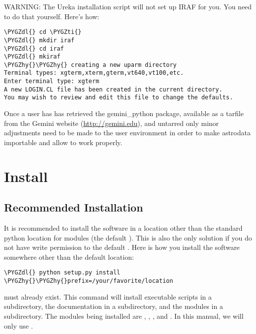 \documentclass[letterpaper,10pt,english]{sphinxmanual}
\def\PYGZdl{\char`\$}
\def\PYGZhy{\char`\-}
\def\PYGZti{\char`\~}
\begin{document}
WARNING:  The Ureka installation script will not set up IRAF for you. You need to do
that yourself. Here's how:

\begin{Verbatim}[commandchars=\\\{\}]
\PYGZdl{} cd \PYGZti{}
\PYGZdl{} mkdir iraf
\PYGZdl{} cd iraf
\PYGZdl{} mkiraf
\PYGZhy{}\PYGZhy{} creating a new uparm directory
Terminal types: xgterm,xterm,gterm,vt640,vt100,etc.
Enter terminal type: xgterm
A new LOGIN.CL file has been created in the current directory.
You may wish to review and edit this file to change the defaults.
\end{Verbatim}

Once a user has has retrieved the gemini\_python package, available as a tarfile
from the Gemini website (\href{http://gemini.edu}{http://gemini.edu}), and untarred only minor adjustments
need to be made to the user environment in order to make astrodata importable and
allow  to work properly.


\section{Install}
\label{userenv:config}\label{userenv:install}

\subsection{Recommended Installation}
\label{userenv:recommended-installation}
It is recommended to install the software in a location other than the standard
python location for modules (the default ). This is also the
only solution if you do not have write permission to the default .
Here is how you install the software somewhere other than the default location:

\begin{Verbatim}[commandchars=\\\{\}]
\PYGZdl{} python setup.py install \PYGZhy{}\PYGZhy{}prefix=/your/favorite/location
\end{Verbatim}

 must already exist.  This command will install executable
scripts in a  subdirectory, the documentation in a  subdirectory,
and the modules in a  subdirectory.  The modules being
installed are , , , and .
In this manual, we will only use .
\end{document}
